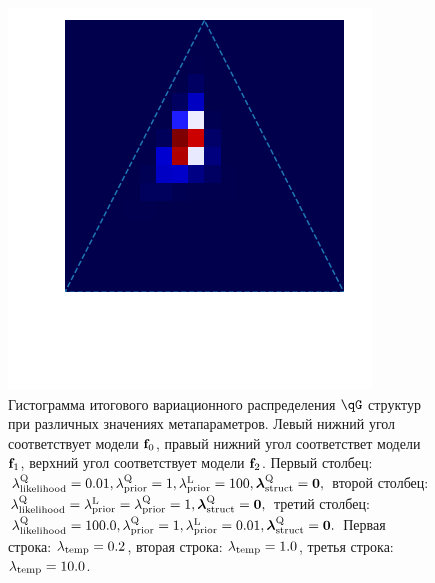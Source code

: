 \begin{figure}
\begin{minipage}{.3\textwidth}
\subcaption{}
\end{minipage}
 \begin{minipage}{.3\textwidth}
    \includegraphics[width=\textwidth]{triangle_10overfit.png}
\subcaption{}
\end{minipage}
\caption{Гистограмма итогового вариационного распределения $\qG$ структур при различных значениях метапараметров. Левый нижний угол соответствует модели $\mathbf{f}_0$, правый нижний угол соответствет модели $\mathbf{f}_1$, верхний угол соответствует модели $\mathbf{f}_2$.
Первый столбец:  $\lambda_\text{likelihood}^\text{Q} = 0.01, \lambda_\text{prior}^\text{Q} = 1, \lambda_\text{prior}^\text{L} = 100, \boldsymbol{\lambda}_\text{struct}^\text{Q} = \mathbf{0},$  второй столбец: $\lambda_\text{likelihood}^\text{Q} = \lambda_\text{prior}^\text{L} = \lambda_\text{prior}^\text{Q} = 1, \boldsymbol{\lambda}_\text{struct}^\text{Q} = \mathbf{0},$ 
третий столбец: $\lambda_\text{likelihood}^\text{Q} = 100.0, \lambda_\text{prior}^\text{Q} = 1, \lambda_\text{prior}^\text{L} = 0.01, \boldsymbol{\lambda}_\text{struct}^\text{Q} = \mathbf{0}.$ 
Первая строка: $\lambda_{\text{temp}} = 0.2$, вторая строка: $\lambda_{\text{temp}} = 1.0$, третья строка: $\lambda_{\text{temp}} = 10.0$.}
\label{fig:fig_triangle_hist}
\end{figure}


